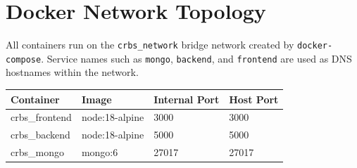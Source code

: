 \documentclass[12pt]{article}
\begin{document}
\section*{Docker Network Topology}

All containers run on the \texttt{crbs\_network} bridge network created by \texttt{docker-compose}. Service names such as \texttt{mongo}, \texttt{backend}, and \texttt{frontend} are used as DNS hostnames within the network.

\begin{center}
\begin{tabular}{|l|l|l|l|}
\hline
\textbf{Container} & \textbf{Image} & \textbf{Internal Port} & \textbf{Host Port} \\
\hline
crbs\_frontend & node:18-alpine & 3000 & 3000 \\
crbs\_backend & node:18-alpine & 5000 & 5000 \\
crbs\_mongo & mongo:6 & 27017 & 27017 \\
\hline
\end{tabular}
\end{center}
\end{document}
